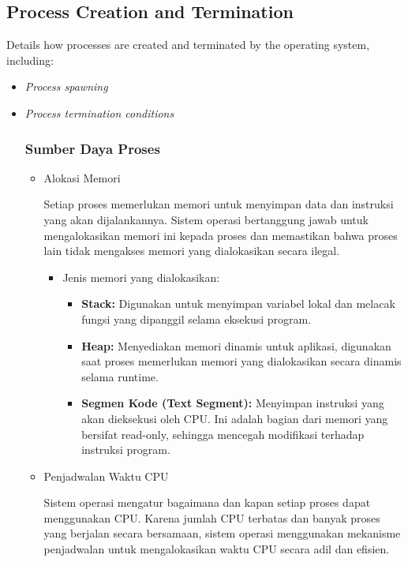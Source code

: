 \documentclass[12pt]{article}
\begin{document}
\subsection{Process Creation and Termination}
Details how processes are created and terminated by the operating system, including:
\begin{itemize}
    \item \textit{Process spawning}
    \item \textit{Process termination conditions}
    \subsubsection{Sumber Daya Proses}
    \begin{itemize}
        \item Alokasi Memori
        
        Setiap proses memerlukan memori untuk menyimpan data dan instruksi yang akan dijalankannya. Sistem operasi bertanggung jawab untuk mengalokasikan memori ini kepada proses dan memastikan bahwa proses lain tidak mengakses memori yang dialokasikan secara ilegal.
        
        \begin{itemize}
            \item Jenis memori yang dialokasikan:
                \begin{itemize}
                    \item \textbf{Stack:} Digunakan untuk menyimpan variabel lokal dan melacak fungsi yang dipanggil selama eksekusi program.
                    \item \textbf{Heap:} Menyediakan memori dinamis untuk aplikasi, digunakan saat proses memerlukan memori yang dialokasikan secara dinamis selama runtime.
                    \item \textbf{Segmen Kode (Text Segment):} Menyimpan instruksi yang akan dieksekusi oleh CPU. Ini adalah bagian dari memori yang bersifat read-only, sehingga mencegah modifikasi terhadap instruksi program.
                \end{itemize}
        \end{itemize}
        
        \item Penjadwalan Waktu CPU
        
        Sistem operasi mengatur bagaimana dan kapan setiap proses dapat menggunakan CPU. Karena jumlah CPU terbatas dan banyak proses yang berjalan secara bersamaan, sistem operasi menggunakan mekanisme penjadwalan untuk mengalokasikan waktu CPU secara adil dan efisien.
        

\end{itemize}
\end{itemize}
\end{document}
